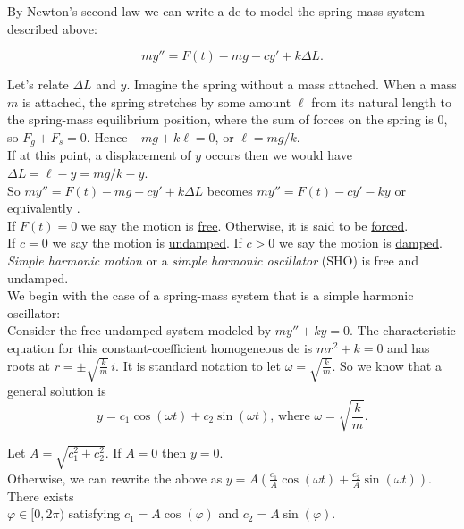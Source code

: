 \documentclass{ximera}
\begin{document}
\vfill

\newpage

 By Newton's second law we can write a de to model the spring-mass system described above:

 $$my''=F(t)-mg-cy'+k\Delta L.$$

\vspace{0.5cm}

 Let's relate $\Delta L$ and $y$.  Imagine the spring without a mass attached.  When a mass $m$ is attached, the spring stretches by some amount $\ell$ from its natural length to the spring-mass equilibrium position, where the sum of forces on the spring is $0$, so $F_{g}+F_{s}=0$.   Hence $-mg+k\ell=0$,  or $\ell=mg/k$.\\

 If at this point, a displacement of $y$ occurs then we would have $\Delta L=\ell-y=mg/k-y$.\\


 So $my''=F(t)-mg-cy'+k\Delta L$ becomes $my''=F(t)-cy'-ky$ or equivalently .\\


 If $F(t)=0$ we say the motion is \underline{free}.  Otherwise, it is said to be \underline{forced}.\\


 If $c=0$ we say the motion is \underline{undamped}.  If $c>0$ we say the motion is \underline{damped}.  \emph{Simple harmonic motion} or a \emph{simple harmonic oscillator} (SHO) is free and undamped.\\


 We begin with the case of a spring-mass system that is a simple harmonic oscillator:\\

 Consider the free undamped system modeled by $my''+ky=0$.  The characteristic equation for this constant-coefficient homogeneous de is $mr^2+k=0$ and has roots at $r=\pm \sqrt{\frac{k}{m}}\,i$.  It is standard notation to let $\omega=\sqrt{\frac{k}{m}}$.   So we know that a general solution is $$y=c_{1}\cos{(\omega t)}+c_{2}\sin{(\omega t)}\mbox{, where }\omega=\sqrt{\frac{k}{m}}.$$


 Let $A=\sqrt{c_1^2+c_2^2}$.   If $A=0$ then $y=0$.  \\

 Otherwise, we can rewrite the above as $y=A\left(\frac{c_{1}}{A}\cos{(\omega t)}+\frac{c_{2}}{A}\sin{(\omega t)}\right)$.   There exists\\ $\varphi\in [0,2\pi)$ satisfying $c_1=A\cos{(\varphi)}$ and $c_2=A\sin{(\varphi)}$.\\
\end{document}
